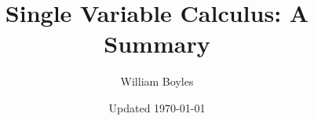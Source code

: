 


	\title{Single Variable Calculus: A Summary}
	\author{William Boyles}
	\date{Updated \today}
	
	\frontmatter
		\maketitle
		\tableofcontents
		
	\mainmatter
		
		
		
		
		
		
		
		
		
		
		
	\appendix
	
	\backmatter


